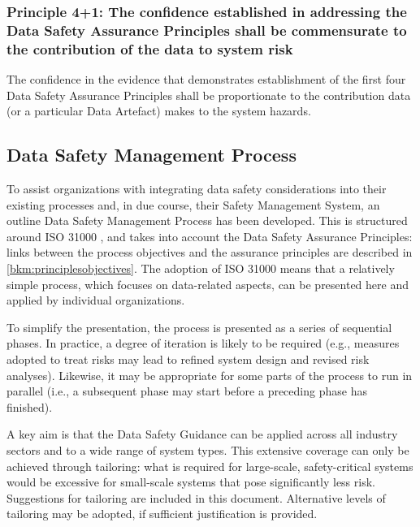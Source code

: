 \subsubsection{Principle 4+1: The confidence established in addressing the Data Safety Assurance Principles shall be commensurate to the contribution of the data to system risk}
The confidence in the evidence that demonstrates establishment of the first four Data Safety Assurance Principles shall be proportionate to the contribution data (or a particular \gls{Data Artefact}) makes to the system hazards.

\subsection{Data Safety Management Process}
To assist organizations with integrating data safety considerations into their existing processes and, in due course, their Safety Management System, an outline Data Safety Management Process has been developed.
This is structured around
ISO 31000 \cite{citation:iso310002018risk},
and takes into account the Data Safety Assurance Principles: links between the process objectives and the assurance principles are described in \autoref{bkm:principlesobjectives}.
The adoption of ISO 31000 means that a relatively simple process, which focuses on data-related aspects, can be presented here and applied by individual organizations. 

To simplify the presentation, the process is presented as a series of sequential phases. In practice, a degree of iteration is likely to be required (e.g., measures adopted to treat risks may lead to refined system design and revised risk analyses). Likewise, it may be appropriate for some parts of the process to run in parallel (i.e., a subsequent phase may start before a preceding phase has finished).

A key aim is that the Data Safety Guidance can be applied across all industry sectors and to a wide range of system types. This extensive coverage can only be achieved through tailoring: what is required for large-scale, safety-critical systems would be excessive for small-scale systems that pose significantly less risk. Suggestions for tailoring are included in this document. Alternative levels of tailoring may be adopted, if sufficient justification is provided.

